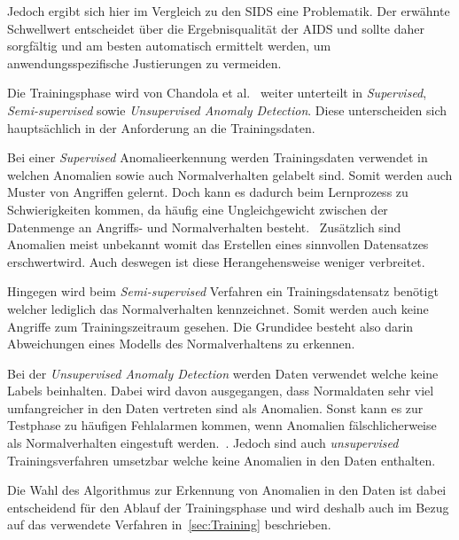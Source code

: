                 Jedoch ergibt sich hier im Vergleich zu den \ac{SIDS} eine Problematik.
                Der erwähnte Schwellwert entscheidet über die Ergebnisqualität der \ac{AIDS} und sollte daher sorgfältig und am besten automatisch ermittelt werden, um anwendungsspezifische Justierungen zu vermeiden.

                Die Trainingsphase wird von Chandola et al.~\cite{ANOMALYSURVEY} weiter unterteilt in \textit{Supervised},
                \textit{Semi-supervised} sowie \textit{Unsupervised Anomaly Detection}.
                Diese unterscheiden sich hauptsächlich in der Anforderung an die Trainingsdaten. 
                
                Bei einer \textit{Supervised} Anomalieerkennung werden Trainingsdaten verwendet 
                in welchen Anomalien sowie auch Normalverhalten gelabelt sind.
                Somit werden auch Muster von Angriffen gelernt.
                Doch kann es dadurch beim Lernprozess zu Schwierigkeiten kommen, da häufig eine Ungleichgewicht zwischen der Datenmenge an Angriffs- und Normalverhalten besteht.~\cite{IMBALANCEPHUA2004}
                Zusätzlich sind Anomalien meist unbekannt womit das Erstellen eines sinnvollen Datensatzes erschwertwird.
                Auch deswegen ist diese Herangehensweise weniger verbreitet.~\cite{UNSUPERVISEDGOLDSTEIN2016}

                
                Hingegen wird beim \textit{Semi-supervised} Verfahren ein Trainingsdatensatz benötigt welcher lediglich das Normalverhalten kennzeichnet.
                Somit werden auch keine Angriffe zum Trainingszeitraum gesehen.
                Die Grundidee besteht also darin Abweichungen eines Modells des Normalverhaltens zu erkennen.
            
                
                Bei der \textit{Unsupervised Anomaly Detection} werden Daten verwendet welche keine Labels beinhalten.
                Dabei wird davon ausgegangen, dass Normaldaten sehr viel umfangreicher in den Daten vertreten sind als Anomalien.
                Sonst kann es zur Testphase zu häufigen Fehlalarmen kommen, wenn Anomalien fälschlicherweise als Normalverhalten eingestuft werden.~\cite{ANOMALYSURVEY2}.
                Jedoch sind auch \textit{unsupervised} Trainingsverfahren umsetzbar welche keine Anomalien in den Daten enthalten.\cite{UNSUPERVISEDGOLDSTEIN2016}

                Die Wahl des Algorithmus zur Erkennung von Anomalien in den Daten ist dabei entscheidend für den Ablauf der Trainingsphase und wird deshalb auch im Bezug auf das verwendete Verfahren in~\autoref{sec:Training} beschrieben.

